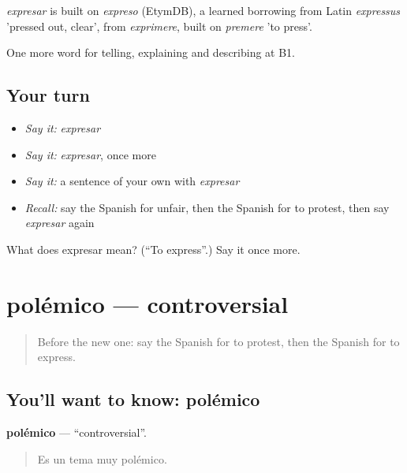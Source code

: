 \begin{cousinweb}
\emph{expresar} is built on \emph{expreso} (EtymDB), a learned borrowing from Latin \emph{expressus} 'pressed out, clear', from \emph{exprimere}, built on \emph{premere} 'to press'.
\end{cousinweb}

\begin{grammarlens}[title={What you've built}]
One more word for telling, explaining and describing at B1.
\end{grammarlens}

\subsection*{Your turn}
\begin{itemize}
\raggedright
  \item \emph{Say it:} \emph{expresar}
  \item \emph{Say it:} \emph{expresar}, once more
  \item \emph{Say it:} a sentence of your own with \emph{expresar}
  \item \emph{Recall:} say the Spanish for unfair, then the Spanish for to protest, then say \emph{expresar} again
\end{itemize}

\begin{tcolorbox}[breakable,colback=teal!4,colframe=teal!35!black,title={Before you move on}]
What does expresar mean? (\textquotedblleft{}To express\textquotedblright{}.) Say it once more.
\end{tcolorbox}
\section[polémico]{polémico — controversial}

\label{lesson:ES-C604-polemico}



\begin{quote}
Before the new one: say the Spanish for to protest, then the Spanish for to express.
\end{quote}

\subsection*{You'll want to know: polémico}
\textbf{polémico} — \textquotedblleft{}controversial\textquotedblright{}.

\begin{quote}
Es un tema muy polémico.
\end{quote}

